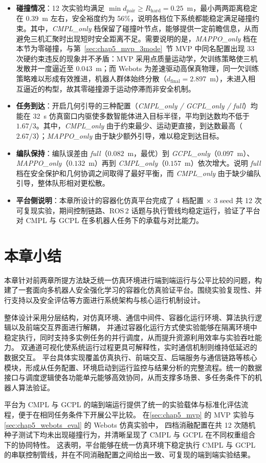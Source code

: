 \begin{itemize}
    \item \textbf{碰撞情况}：12 次实验均满足 $\min d_{\text{pair}} \ge R_{\text{hard}}=0.25$~m，最小两两距离稳定在 $0.39$~m 左右，安全裕度约为 56\%，说明各档位下系统都能稳定满足碰撞约束。其中，\textit{CMPL\_only} 档保留了碰撞叶节点，能够提供一定前瞻信息，从而避免三机汇聚时出现短时安全距离不足。需要说明的是，\textit{MAPPO\_only} 档在本节为零碰撞，与第~\ref{sec:chap5_mvp_3mode}~节 MVP 中同名配置出现 33 次硬约束违反的现象并不矛盾：MVP 采用点质量运动学，欠训练策略使三机发散并一度逼近至 $0.043$~m；而 Webots 为差速驱动高保真物理，同一欠训练策略难以形成有效推进，机器人群体始终分散（$d_{\text{final}}=2.897$~m），未进入相互逼近的构型，故其零碰撞源于运动停滞而非安全机制。
    \item \textbf{任务到达}：开启几何引导的三种配置（\textit{CMPL\_only / GCPL\_only / full}）均能在 32~s 仿真窗口内驱使多数智能体进入目标半径，平均到达数均不低于 $1.67/3$。其中，\textit{CMPL\_only} 由于约束最少、运动更直接，到达数最高（$2.67/3$）；\textit{MAPPO\_only} 由于缺少额外引导，难以稳定到达目标。
    \item \textbf{编队保持}：编队误差由 \textit{full}（$0.082$~m，最优）到 \textit{GCPL\_only}（$0.097$~m）、\textit{MAPPO\_only}（$0.132$~m）再到 \textit{CMPL\_only}（$0.157$~m）依次增大。说明 \textit{full} 档在安全保护和几何协调之间取得了最好平衡，而 \textit{CMPL\_only} 由于缺少编队引导，整体队形相对更松散。
    \item \textbf{平台侧说明}：本章所设计的容器化仿真平台完成了 4 档配置 $\times$ 3 seed 共 12 次可复现实验，期间控制链路、ROS\,2 话题与执行管线均稳定运行，验证了平台对 CMPL 与 GCPL 在多机器人任务下的承载与对比能力。
\end{itemize}

\section{本章小结}

本章针对前两章所提方法缺乏统一仿真环境进行端到端运行与公平比较的问题，构建了一套面向多机器人安全强化学习的容器化仿真验证平台。围绕实验复现性、并行支持以及安全评估等方面进行系统架构与核心运行机制设计。

整体设计采用分层结构，对仿真环境、通信中间件、容器化运行环境、算法执行逻辑以及前端交互界面进行解耦，
并通过容器化运行方式使实验能够在隔离环境中稳定执行，同时支持多实例任务的并行调度，从而提升资源利用效率与实验吞吐能力。
双通道可视化使系统运行过程更具可解释性，实时通信机制则维持低延迟的数据交互。
平台具体实现覆盖仿真执行、前端交互、后端服务与通信链路等核心模块，形成从任务配置、环境启动到运行监控与结果分析的完整流程。统一的数据接口与调度逻辑使各功能单元能够高效协同，从而支撑多场景、多任务条件下的机器人算法验证。

平台为 CMPL 与 GCPL 的端到端运行提供了统一的实验载体与标准化评估流程，便于在相同任务条件下开展公平比较。
在\ref{sec:chap5_mvp} 的 MVP 实验与\ref{sec:chap5_webots_eval} 的 Webots 仿真实验中，
四档消融配置在共 12 次随机种子测试下均未出现碰撞行为，并清晰呈现了 CMPL 与 GCPL 在不同权重组合下的协同特性。
这表明，平台能够在统一仿真环境下稳定执行 CMPL 与 GCPL 的串联控制管线，并在不同消融配置之间给出一致、可复现的端到端实验结果。
